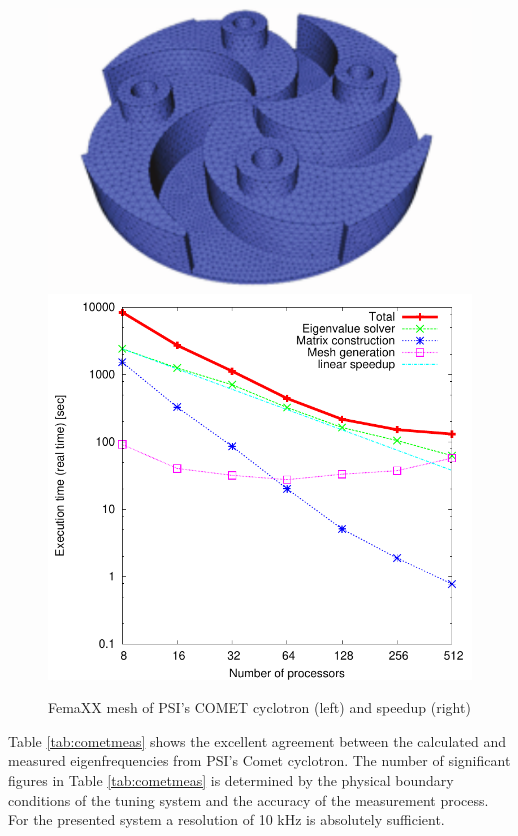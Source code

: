 \documentclass[11pt,pdftex]{article}
\newcommand{\gnuplotrot}{0.0}
\newcommand{\minipagescale}{1.0}
\begin{document}
\begin{figure}[h]
  \begin{minipage}[b]{\minipagescale\textwidth}
    \includegraphics[angle=\gnuplotrot,scale=1.0]{./figures/Comet.pdf}
    \includegraphics[angle=\gnuplotrot,scale=0.6]{./figures/xt3_comet1.pdf}
  \end{minipage}
  \caption{FemaXX mesh of PSI's COMET cyclotron (left) and speedup
    (right)}
  \label{fig:xt3cometfemaxx}
\end{figure}
Table \ref{tab:cometmeas} shows the excellent agreement between the
calculated and measured eigenfrequencies from PSI's Comet cyclotron. The
number of significant figures in Table \ref{tab:cometmeas} is determined
by the physical boundary conditions of the tuning system and the
accuracy of the measurement process. For the presented system a
resolution of 10 kHz is absolutely sufficient.
\end{document}
